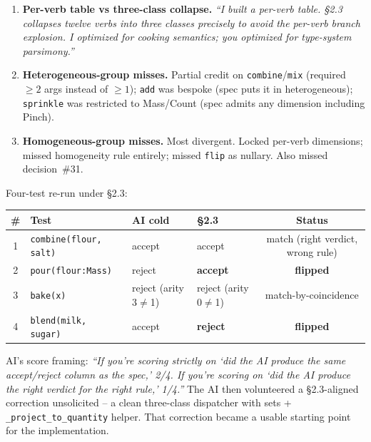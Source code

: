 \documentclass[11pt,a4paper]{article}
\begin{document}
\begin{enumerate}[leftmargin=*,itemsep=2pt]
  \item \textbf{Per-verb table vs three-class collapse.}
        \emph{``I built a per-verb table. \S2.3 collapses twelve verbs
        into three classes precisely to avoid the per-verb branch
        explosion. I optimized for cooking semantics; you optimized for
        type-system parsimony.''}
  \item \textbf{Heterogeneous-group misses.} Partial credit on
        \texttt{combine}/\texttt{mix} (required $\geq 2$ args instead of
        $\geq 1$); \texttt{add} was bespoke (spec puts it in
        heterogeneous); \texttt{sprinkle} was restricted to Mass/Count
        (spec admits any dimension including Pinch).
  \item \textbf{Homogeneous-group misses.} Most divergent. Locked
        per-verb dimensions; missed homogeneity rule entirely; missed
        \texttt{flip} as nullary. Also missed decision~\#31.
\end{enumerate}

Four-test re-run under \S2.3:

\begin{center}
\small
\begin{tabular}{@{}clllc@{}}
\toprule
\textbf{\#} & \textbf{Test} & \textbf{AI cold} & \textbf{\S2.3} & \textbf{Status} \\
\midrule
1 & \texttt{combine(flour, salt)}     & accept & accept              & match (right verdict, wrong rule) \\
2 & \texttt{pour(flour:Mass)}         & reject & \textbf{accept}     & \textbf{flipped} \\
3 & \texttt{bake(x)}                  & reject (arity 3$\neq$1) & reject (arity 0$\neq$1) & match-by-coincidence \\
4 & \texttt{blend(milk, sugar)}       & accept & \textbf{reject}     & \textbf{flipped} \\
\bottomrule
\end{tabular}
\end{center}

AI's score framing: \emph{``If you're scoring strictly on `did the AI
produce the same accept/reject column as the spec,' 2/4. If you're
scoring on `did the AI produce the right verdict for the right rule,'
1/4.''} The AI then volunteered a \S2.3-aligned correction unsolicited
-- a clean three-class dispatcher with sets + \texttt{\_project\_to\_quantity}
helper. That correction became a usable starting point for the
implementation.
\end{document}

